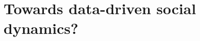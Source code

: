 \documentclass[compress]{beamer}
\begin{document}
%
%
%
%
%
%
%
%
%
%
%
%
%    


\section[Data-driven social dynamics]{Towards data-driven social dynamics?}
\end{document}
